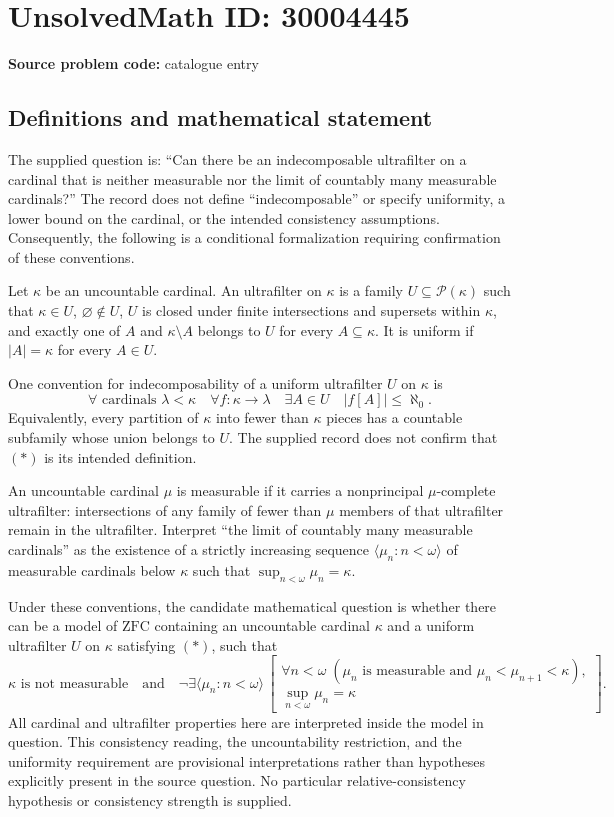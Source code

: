\documentclass[11pt]{article}
\begin{document}
\section*{UnsolvedMath ID: 30004445}
\textbf{Source problem code:} catalogue entry
\subsection{Definitions and mathematical statement}
The supplied question is: ``Can there be an indecomposable ultrafilter on a cardinal that is neither measurable nor the limit of countably many measurable cardinals?'' The record does not define ``indecomposable'' or specify uniformity, a lower bound on the cardinal, or the intended consistency assumptions. Consequently, the following is a conditional formalization requiring confirmation of these conventions.

Let \(\kappa\) be an uncountable cardinal. An ultrafilter on \(\kappa\) is a family \(U\subseteq\mathcal P(\kappa)\) such that \(\kappa\in U\), \(\varnothing\notin U\), \(U\) is closed under finite intersections and supersets within \(\kappa\), and exactly one of \(A\) and \(\kappa\setminus A\) belongs to \(U\) for every \(A\subseteq\kappa\). It is uniform if \(|A|=\kappa\) for every \(A\in U\).

One convention for indecomposability of a uniform ultrafilter \(U\) on \(\kappa\) is
\[
\forall\text{ cardinals }\lambda<\kappa\quad
\forall f:\kappa\longrightarrow\lambda\quad
\exists A\in U\quad |f[A]|\leq\aleph_0.
\tag{*}
\]
Equivalently, every partition of \(\kappa\) into fewer than \(\kappa\) pieces has a countable subfamily whose union belongs to \(U\). The supplied record does not confirm that \((*)\) is its intended definition.

An uncountable cardinal \(\mu\) is measurable if it carries a nonprincipal \(\mu\)-complete ultrafilter: intersections of any family of fewer than \(\mu\) members of that ultrafilter remain in the ultrafilter. Interpret ``the limit of countably many measurable cardinals'' as the existence of a strictly increasing sequence \(\langle\mu_n:n<\omega\rangle\) of measurable cardinals below \(\kappa\) such that \(\sup_{n<\omega}\mu_n=\kappa\).

Under these conventions, the candidate mathematical question is whether there can be a model of \(\mathrm{ZFC}\) containing an uncountable cardinal \(\kappa\) and a uniform ultrafilter \(U\) on \(\kappa\) satisfying \((*)\), such that
\[
\kappa\text{ is not measurable}
\quad\text{and}\quad
\neg\exists\langle\mu_n:n<\omega\rangle\,
\left[
\begin{gathered}
\forall n<\omega\;
(\mu_n\text{ is measurable and }\mu_n<\mu_{n+1}<\kappa),\\
\sup_{n<\omega}\mu_n=\kappa
\end{gathered}
\right].
\]
All cardinal and ultrafilter properties here are interpreted inside the model in question. This consistency reading, the uncountability restriction, and the uniformity requirement are provisional interpretations rather than hypotheses explicitly present in the source question. No particular relative-consistency hypothesis or consistency strength is supplied.
\end{document}
